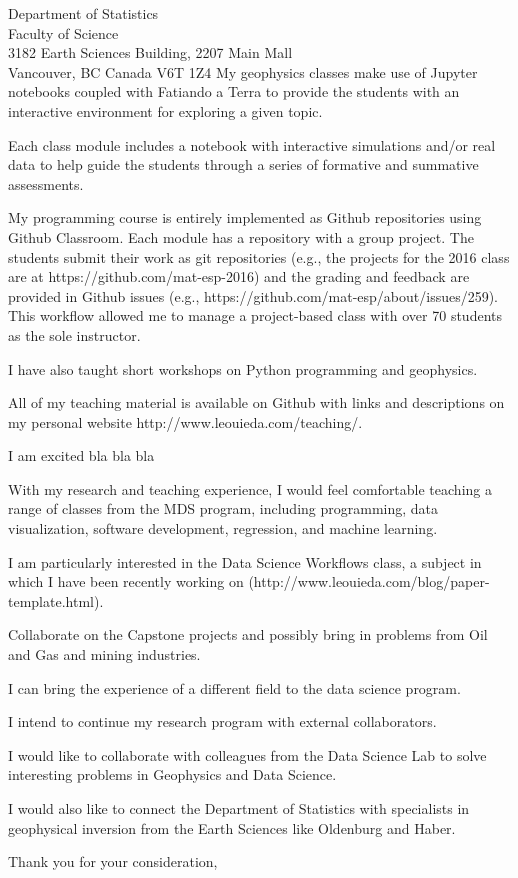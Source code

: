 \documentclass[11pt]{letter}
\begin{document}
\begin{letter}{
    Department of Statistics
    \\
    Faculty of Science
    \\
    3182 Earth Sciences Building, 2207 Main Mall
    \\
    Vancouver, BC Canada V6T 1Z4
}
My geophysics classes make use of Jupyter notebooks coupled with Fatiando a
Terra to provide the students with an interactive environment for exploring a
given topic.

Each class module includes a notebook with interactive simulations and/or real
data to help guide the students through a series of formative and summative
assessments.

My programming course is entirely implemented as Github repositories using
Github Classroom.
Each module has a repository with a group project.
The students submit their work as git repositories (e.g., the projects for the
2016 class are at https://github.com/mat-esp-2016) and the grading and feedback
are provided in Github issues (e.g.,
https://github.com/mat-esp/about/issues/259).
This workflow allowed me to manage a project-based class with over 70 students
as the sole instructor.

I have also taught short workshops on Python programming and geophysics.

All of my teaching material is available on Github with links and descriptions
on my personal website http://www.leouieda.com/teaching/.



I am excited bla bla bla

With my research and teaching experience, I would feel comfortable teaching a
range of classes from the MDS program, including
programming, data visualization, software development, regression, and machine
learning.

I am particularly interested in the Data Science Workflows class, a subject in
which I have been recently working on
(http://www.leouieda.com/blog/paper-template.html).

Collaborate on the Capstone projects and possibly bring in problems from Oil
and Gas and mining industries.

I can bring the experience of a different field to the data science program.

I intend to continue my research program with external collaborators.

I would like to collaborate with colleagues from the Data Science Lab to solve
interesting problems in Geophysics and Data Science.

I would also like to connect the Department of Statistics with specialists in
geophysical inversion from the Earth Sciences like Oldenburg and Haber.


\closing{Thank you for your consideration,}

\end{letter}
\end{document}
